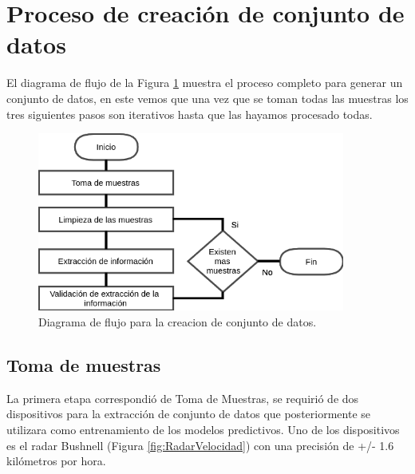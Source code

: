 \section{Proceso de creación de conjunto de datos}

El diagrama de flujo de la Figura \ref{fig:DFCreacionCD} muestra el proceso completo para generar un conjunto de datos, en este vemos que una vez que se toman todas las muestras los tres siguientes pasos son iterativos hasta que las hayamos procesado todas.

\begin{figure}[H]
    \centering
    \includegraphics[width=0.9\textwidth]{Metodologia/imgs/FlowSystem.png}
    \caption{Diagrama de flujo para la creacion de conjunto de datos.}
    \label{fig:DFCreacionCD}
\end{figure}


\subsection{Toma de muestras}

La primera etapa correspondió de Toma de Muestras, se requirió de dos dispositivos para la extracción de conjunto de datos que posteriormente se utilizara como entrenamiento de los modelos predictivos. Uno de los dispositivos es el radar Bushnell (Figura \ref{fig:RadarVelocidad}) con una precisión de +/- 1.6 kilómetros por hora.


